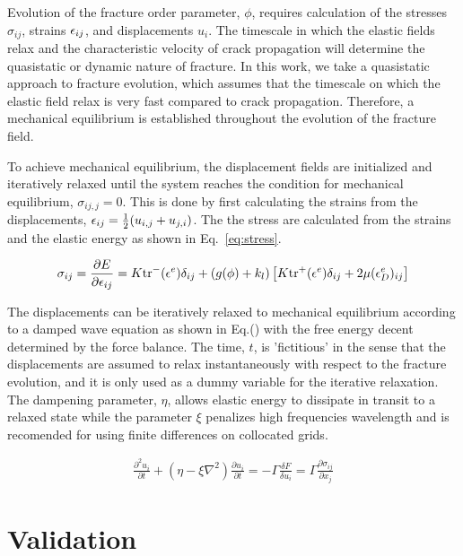 Evolution of the fracture order parameter, $\phi$, requires calculation of the stresses $\sigma_{ij}$, strains $\epsilon_{ij}$, and displacements $u_i$.
The timescale in which the elastic fields relax and the characteristic velocity of crack propagation will determine the quasistatic or dynamic nature of fracture. In this work, we take a quasistatic approach to fracture evolution, which assumes that the timescale on which the elastic field relax is very fast compared to crack propagation. Therefore, a mechanical equilibrium is established throughout the evolution of the fracture field.

To achieve mechanical equilibrium, the displacement fields are initialized and iteratively relaxed until the system reaches the condition for mechanical equilibrium, $\sigma_{ij,j} = 0$. This is done by first calculating the strains from the displacements, $\epsilon_{ij}=\tfrac{1}{2}(u_{i,j} + u_{j,i})$. The the stress are calculated from the strains and the elastic energy as shown in Eq.~\ref{eq:stress}.


\begin{align*}\label{eq:stress}
	\sigma_{ij} = \frac{\partial E}{\partial \epsilon_{ij}} 
	=	K\text{tr}^-(\epsilon^e)\delta_{ij} + (g(\phi)+k_l)\left[ K\text{tr}^+(\epsilon^e)\delta_{ij} + 2\mu (\epsilon_D^e)_{ij}\right]
\end{align*}


The displacements can be iteratively relaxed to mechanical equilibrium according to a damped wave equation as shown in Eq.() with the free energy decent determined by the force balance. The time, $t$, is 'fictitious' in the sense that the displacements are assumed to relax instantaneously with respect to the fracture evolution, and it is only used as a dummy variable for the iterative relaxation. The dampening parameter, $\eta$, allows elastic energy to dissipate in transit to a relaxed state while the parameter $\xi$ penalizes high frequencies wavelength and is recomended for using finite differences on collocated grids.  


\begin{align}
\frac{\partial^2 u_i}{\partial t} + (\eta - \xi\nabla^2)\frac{\partial u_i}{\partial t} = -\Gamma \frac{\delta F}{\delta u_i} = \Gamma \frac{\partial \sigma_{ij}}{\partial x_j}
\end{align}



\section{Validation}

